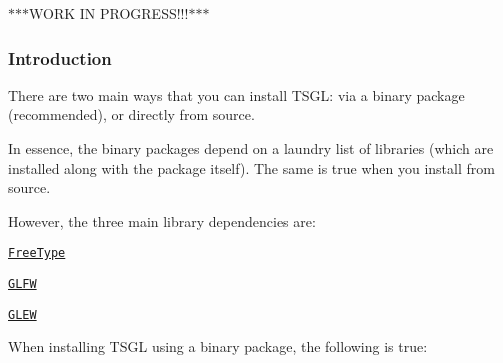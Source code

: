 $\ast$$\ast$$\ast$\-W\-O\-R\-K I\-N P\-R\-O\-G\-R\-E\-S\-S!!!$\ast$$\ast$$\ast$

\subsubsection*{Introduction}

There are two main ways that you can install T\-S\-G\-L\-: via a binary package (recommended), or directly from source.

In essence, the binary packages depend on a laundry list of libraries (which are installed along with the package itself). The same is true when you install from source.

However, the three main library dependencies are\-:


\begin{DoxyItemize}
\item \href{https://www.freetype.org/download.html}{\tt Free\-Type}
\item \href{https://www.glfw.org/download.html}{\tt G\-L\-F\-W}
\item \href{https://downloads.sourceforge.net/project/glew/glew/1.12.0/glew-1.12.0.zip}{\tt G\-L\-E\-W}
\end{DoxyItemize}

When installing T\-S\-G\-L using a binary package, the following is true\-:


